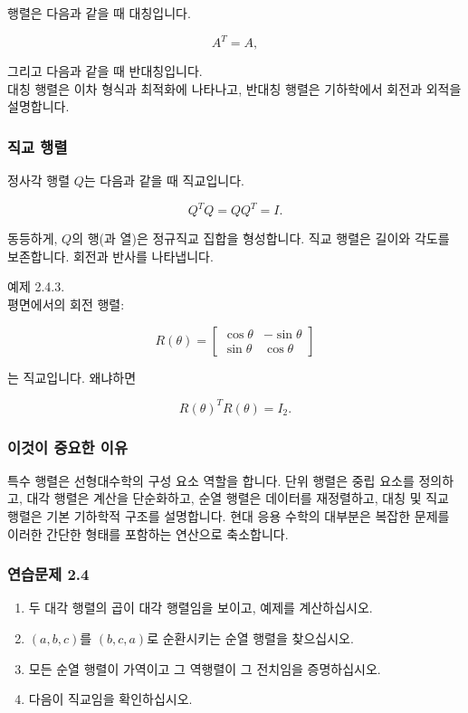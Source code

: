 \documentclass[
  12pt,
  a4paper,
]{article}
\begin{document}
행렬은 다음과 같을 때 대칭입니다.

\[A^T = A,\]

그리고 다음과 같을 때 반대칭입니다.\\
대칭 행렬은 이차 형식과 최적화에 나타나고, 반대칭 행렬은 기하학에서 회전과 외적을 설명합니다.

\subsubsection{직교 행렬}\label{orthogonal-matrices}

정사각 행렬 \(Q\)는 다음과 같을 때 직교입니다.

\[Q^T Q = QQ^T = I.\]

동등하게, \(Q\)의 행(과 열)은 정규직교 집합을 형성합니다. 직교 행렬은 길이와 각도를 보존합니다. 회전과 반사를 나타냅니다.

예제 2.4.3.\\
평면에서의 회전 행렬:

\[R(\theta) = \begin{bmatrix}
\cos\theta & -\sin\theta \\
\sin\theta & \cos\theta
\end{bmatrix}\]

는 직교입니다. 왜냐하면

\[R(\theta)^T R(\theta) = I_2.\]

\subsubsection{이것이 중요한 이유}\label{why-this-matters-7}

특수 행렬은 선형대수학의 구성 요소 역할을 합니다. 단위 행렬은 중립 요소를 정의하고, 대각 행렬은 계산을 단순화하고, 순열 행렬은 데이터를 재정렬하고, 대칭 및 직교 행렬은 기본 기하학적 구조를 설명합니다. 현대 응용 수학의 대부분은 복잡한 문제를 이러한 간단한 형태를 포함하는 연산으로 축소합니다.

\subsubsection{연습문제 2.4}\label{exercises-24}

\begin{enumerate}
\def\labelenumi{\arabic{enumi}.}
\item
  두 대각 행렬의 곱이 대각 행렬임을 보이고, 예제를 계산하십시오.
\item
  \((a,b,c)\)를 \((b,c,a)\)로 순환시키는 순열 행렬을 찾으십시오.
\item
  모든 순열 행렬이 가역이고 그 역행렬이 그 전치임을 증명하십시오.
\item
  다음이 직교임을 확인하십시오.
\end{enumerate}
\end{document}
